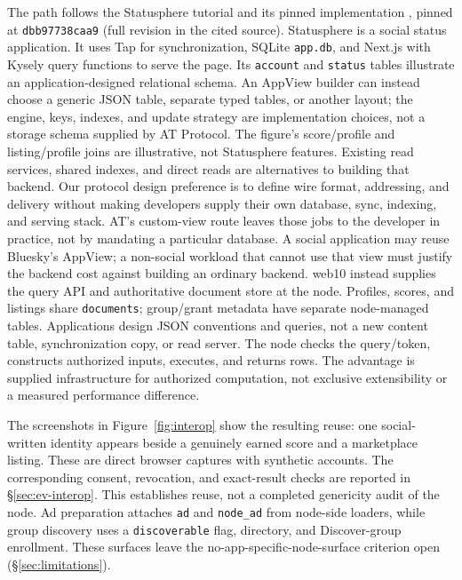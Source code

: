 \documentclass[sigconf, nonacm]{acmart}
\begin{document}
The path follows the Statusphere tutorial and its pinned implementation
\cite{at-statusphere,at-statusphere-source}, pinned at
\texttt{dbb97738caa9} (full revision in the cited source).
Statusphere is a social status application. It uses Tap for synchronization,
SQLite \texttt{app.db}, and Next.js with Kysely query functions to serve the page.
Its \texttt{account} and \texttt{status} tables illustrate an
application-designed relational schema. An AppView builder can instead
choose a generic JSON table, separate typed tables, or another layout;
the engine, keys, indexes, and update strategy are implementation choices,
not a storage schema supplied by AT Protocol. The figure's score/profile
and listing/profile joins are illustrative, not Statusphere features.
Existing read services, shared indexes, and direct reads are alternatives
to building that backend. Our protocol design preference is to define
wire format, addressing, and delivery without making developers supply
their own database, sync, indexing, and serving stack. AT's custom-view
route leaves those jobs to the developer in practice, not by mandating a
particular database. A social application may reuse Bluesky's AppView;
a non-social workload that cannot use that view must justify the backend
cost against building an ordinary backend. web10 instead supplies the query API and
authoritative document store at the node. Profiles, scores, and listings
share \texttt{documents}; group/grant metadata have separate node-managed
tables. Applications design JSON conventions and queries, not a new
content table, synchronization copy, or read server. The node checks the
query/token, constructs authorized inputs, executes, and returns rows.
The advantage is supplied infrastructure for
authorized computation, not exclusive extensibility or a measured
performance difference.

The screenshots in Figure~\ref{fig:interop} show the resulting reuse:
one social-written identity appears beside a genuinely earned score and
a marketplace listing. These are direct browser captures with synthetic
accounts. The corresponding consent, revocation, and exact-result
checks are reported in \S\ref{sec:ev-interop}. This establishes reuse,
not a completed genericity audit of the node. Ad preparation attaches
\texttt{ad} and \texttt{node\_ad} from node-side loaders, while group
discovery uses a \texttt{discoverable} flag, directory, and Discover-group
enrollment. These surfaces leave the no-app-specific-node-surface criterion
open (\S\ref{sec:limitations}).
\end{document}
